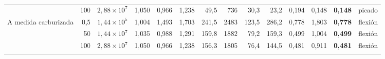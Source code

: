 \documentclass[11pt,a4paper]{article}
\begin{document}
\begin{table}[H]
\begin{tabular}{l r r c c c r r r r r r r l}
 & 100 & $2{,}88\times10^{7}$ & 1,050 & 0,966 & 1,238 & 49,5 & 736 & 30,3 & 23,2 & 0,194 & 0,148 & \textbf{0,148} & picado \\
\addlinespace[2pt]
A medida carburizada & 0,5 & $1{,}44\times10^{5}$ & 1,004 & 1,493 & 1,703 & 241,5 & 2483 & 123,5 & 286,2 & 0,778 & 1,803 & \textbf{0,778} & flexión \\
 & 50 & $1{,}44\times10^{7}$ & 1,035 & 0,988 & 1,291 & 159,8 & 1882 & 79,2 & 159,3 & 0,499 & 1,004 & \textbf{0,499} & flexión \\
 & 100 & $2{,}88\times10^{7}$ & 1,050 & 0,966 & 1,238 & 156,3 & 1805 & 76,4 & 144,5 & 0,481 & 0,911 & \textbf{0,481} & flexión \\
\addlinespace[2pt]
\bottomrule\end{tabular}\end{table}
\end{document}
